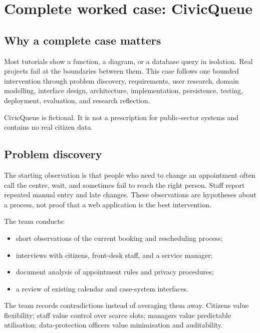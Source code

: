 \chapter{Complete worked case: CivicQueue}
\label{ch:civicqueue}

\section{Why a complete case matters}
Most tutorials show a function, a diagram, or a database query in isolation. Real projects fail at the boundaries between them. This case follows one bounded intervention through problem discovery, requirements, user research, domain modelling, interface design, architecture, implementation, persistence, testing, deployment, evaluation, and research reflection.

CivicQueue is fictional. It is not a prescription for public-sector systems and contains no real citizen data.

\section{Problem discovery}
The starting observation is that people who need to change an appointment often call the centre, wait, and sometimes fail to reach the right person. Staff report repeated manual entry and late changes. These observations are hypotheses about a process, not proof that a web application is the best intervention.

The team conducts:
\begin{itemize}
\item short observations of the current booking and rescheduling process;
\item interviews with citizens, front-desk staff, and a service manager;
\item document analysis of appointment rules and privacy procedures;
\item a review of existing calendar and case-system interfaces.
\end{itemize}
The team records contradictions instead of averaging them away. Citizens value flexibility; staff value control over scarce slots; managers value predictable utilisation; data-protection officers value minimisation and auditability.

